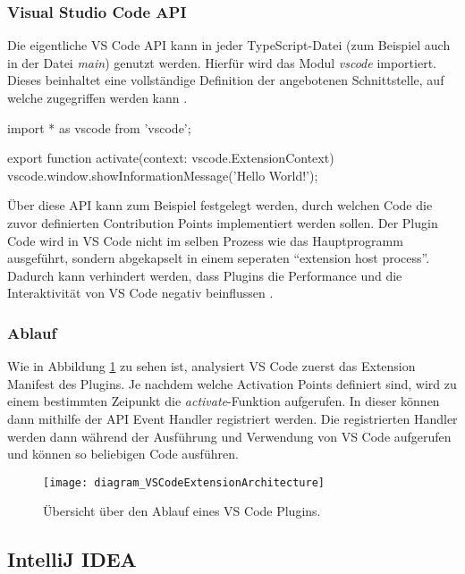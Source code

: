 \subsubsection{Visual Studio Code API} 
  Die eigentliche VS Code API kann in jeder TypeScript-Datei 
  (zum Beispiel auch in der Datei \emph{main}) genutzt werden. 
  Hierfür wird das Modul \emph{vscode} importiert. 
  Dieses beinhaltet eine vollständige Definition der angebotenen
  Schnittstelle, auf welche zugegriffen werden kann 
  \cite{VSCodeExtensionAPIExtensionAnatomy,VSCodeExtensionAPIVSCodeAPI}.
\begin{JsCode}
    import * as vscode from 'vscode';

    export function activate(context: vscode.ExtensionContext) {
      vscode.window.showInformationMessage('Hello World!');
    } 
\end{JsCode}
  Über diese API kann zum Beispiel festgelegt werden, durch welchen Code
  die zuvor definierten Contribution Points implementiert werden sollen.
  Der Plugin Code wird in VS Code nicht im selben Prozess wie das
  Hauptprogramm ausgeführt, sondern abgekapselt in einem seperaten 
  \enquote{extension host process}. Dadurch kann verhindert werden, dass
  Plugins die Performance und die Interaktivität von VS Code negativ beinflussen 
  \cite{VSCodeArchitecture,VSCodeApproachToExtensibility}.
\subsubsection{Ablauf}
  Wie in Abbildung \ref{fig:diagram_VSCodeExtensionArchitecture} zu sehen ist,
  analysiert VS Code zuerst das Extension Manifest des Plugins.
  Je nachdem welche Activation Points definiert sind, wird zu einem
  bestimmten Zeipunkt die \emph{activate}-Funktion aufgerufen. In dieser 
  können dann mithilfe der API Event Handler registriert werden. 
  Die registrierten Handler werden dann während der Ausführung und Verwendung
  von VS Code aufgerufen und können so beliebigen Code ausführen.
  \begin{figure}
    \centering
    \texttt{[image: diagram\_VSCodeExtensionArchitecture]}
    \caption{Übersicht über den Ablauf eines VS Code Plugins.}
    \label{fig:diagram_VSCodeExtensionArchitecture}
  \end{figure}   

\subsection{IntelliJ IDEA}

